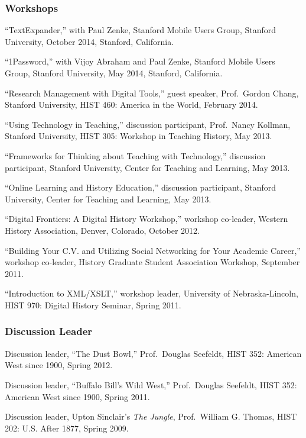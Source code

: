 \subsubsection{Workshops}\label{workshops}

``TextExpander,'' with Paul Zenke, Stanford Mobile Users Group, Stanford
University, October 2014, Stanford, California.

``1Password,'' with Vijoy Abraham and Paul Zenke, Stanford Mobile Users
Group, Stanford University, May 2014, Stanford, California.

``Research Management with Digital Tools,'' guest speaker, Prof.~Gordon
Chang, Stanford University, HIST 460: America in the World, February
2014.

``Using Technology in Teaching,'' discussion participant, Prof.~Nancy
Kollman, Stanford University, HIST 305: Workshop in Teaching History,
May 2013.

``Frameworks for Thinking about Teaching with Technology,'' discussion
participant, Stanford University, Center for Teaching and Learning, May
2013.

``Online Learning and History Education,'' discussion participant,
Stanford University, Center for Teaching and Learning, May 2013.

``Digital Frontiers: A Digital History Workshop,'' workshop co-leader,
Western History Association, Denver, Colorado, October 2012.

``Building Your C.V. and Utilizing Social Networking for Your Academic
Career,'' workshop co-leader, History Graduate Student Association
Workshop, September 2011.

``Introduction to XML/XSLT,'' workshop leader, University of
Nebraska-Lincoln, HIST 970: Digital History Seminar, Spring 2011.

\subsubsection{Discussion Leader}\label{discussion-leader}

Discussion leader, ``The Dust Bowl,'' Prof.~Douglas Seefeldt, HIST 352:
American West since 1900, Spring 2012.

Discussion leader, ``Buffalo Bill's Wild West,'' Prof.~Douglas Seefeldt,
HIST 352: American West since 1900, Spring 2011.

Discussion leader, Upton Sinclair's \emph{The Jungle}, Prof.~William G.
Thomas, HIST 202: U.S. After 1877, Spring 2009.

